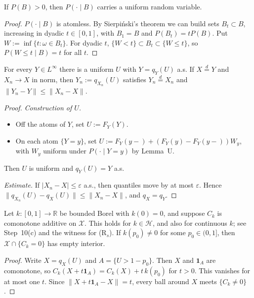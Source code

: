 \begin{lemma}[Lemma U]
If $P(B)>0$, then $P(\cdot\mid B)$ carries a uniform random variable.
\end{lemma}

\begin{proof}
$P(\cdot\mid B)$ is atomless. By Sierpi\'nski's theorem we can build sets $B_t\subset B$, increasing in dyadic $t\in[0,1]$, with $B_1=B$ and $P(B_t)=tP(B)$. Put $W:=\inf\{t:\omega\in B_t\}$. For dyadic $t$, $\{W<t\}\subset B_t\subset\{W\le t\}$, so $P(W\le t\mid B)=t$ for all $t$.
\end{proof}

\begin{lemma}
For every $Y\in L^\infty$ there is a uniform $U$ with $Y=q_Y(U)$ a.s. If $X\overset d=Y$ and $X_n\to X$ in norm, then $Y_n:=q_{X_n}(U)$ satisfies $Y_n\overset d=X_n$ and $\|Y_n-Y\|\le\|X_n-X\|$.
\end{lemma}

\begin{proof}
\emph{Construction of $U$.}
\begin{itemize}
\item Off the atoms of $Y$, set $U:=F_Y(Y)$.
\item On each atom $\{Y=y\}$, set $U:=F_Y(y-)+(F_Y(y)-F_Y(y-))W_y$, with $W_y$ uniform under $P(\cdot\mid Y=y)$ by Lemma~U.
\end{itemize}
Then $U$ is uniform and $q_Y(U)=Y$ a.s.

\emph{Estimate.} If $|X_n-X|\le\varepsilon$ a.s., then quantiles move by at most $\varepsilon$. Hence $\|q_{X_n}(U)-q_X(U)\|\le\|X_n-X\|$, and $q_X=q_Y$.
\end{proof}

\begin{lemma}[Sweep]
Let $k:[0,1]\to\mathbb R$ be bounded Borel with $k(0)=0$, and suppose $C_k$ is comonotone additive on $\mathcal X$. This holds for $k\in\mathcal H$, and also for continuous $k$; see Step~10(c) and the witness for (R$_s$). If $k(p_0)\neq0$ for some $p_0\in(0,1]$, then $\mathcal X\cap\{C_k=0\}$ has empty interior.
\end{lemma}

\begin{proof}
Write $X=q_X(U)$ and $A=\{U>1-p_0\}$. Then $X$ and $\mathbf 1_A$ are comonotone, so $C_k(X+t\mathbf 1_A)=C_k(X)+t\,k(p_0)$ for $t>0$. This vanishes for at most one $t$. Since $\|X+t\mathbf 1_A-X\|=t$, every ball around $X$ meets $\{C_k\neq0\}$.
\end{proof}

